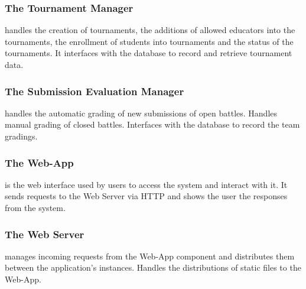 \documentclass{article}
\begin{document}
\subsubsection{The Tournament Manager}
handles the creation of tournaments, the additions of allowed educators into the tournaments, the enrollment of students into tournaments and the status of the tournaments. It interfaces with the database to record and retrieve tournament data.
\subsubsection{The Submission Evaluation Manager}
handles the automatic grading of new submissions of open battles. Handles manual grading of closed battles. Interfaces with the database to record the team gradings. 
\subsubsection{The Web-App}
is the web interface used by users to access the system and interact with it. It sends requests to the Web Server via HTTP and shows the user the responses from the system.
\subsubsection{The Web Server}
manages incoming requests from the Web-App component and distributes them between the application’s instances. Handles the distributions of static files to the Web-App.
\end{document}
